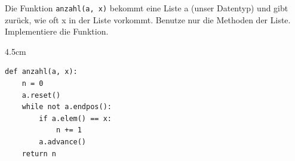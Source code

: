 \question[3]
Die Funktion \texttt{anzahl(a, x)} bekommt eine Liste a (unser Datentyp) und gibt zurück, wie oft x in der Liste vorkommt.
Benutze nur die Methoden der Liste. Implementiere die Funktion.
\begin{solutionbox}{4.5cm}
\begin{lstlisting}
def anzahl(a, x):
    n = 0
    a.reset()
    while not a.endpos():
        if a.elem() == x:
            n += 1
        a.advance()
    return n
\end{lstlisting}
\end{solutionbox}
